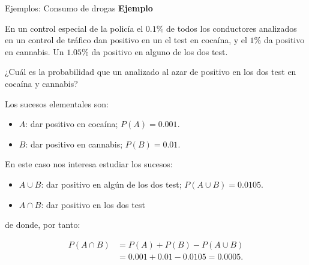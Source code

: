 \documentclass[
  ignorenonframetext,
]{beamer}
\providecommand{\tightlist}{%
  \setlength{\itemsep}{0pt}\setlength{\parskip}{0pt}}
\begin{document}
\begin{frame}{Ejemplos: Consumo de drogas}
\protect\hypertarget{ejemplos-consumo-de-drogas}{}
\textbf{Ejemplo}

En un control especial de la policía el \(0.1\%\) de todos los
conductores analizados en un control de tráfico dan positivo en un el
test en cocaína, y el \(1\%\) da positivo en cannabis. Un \(1.05\%\) da
positivo en alguno de los dos test.

¿Cuál es la probabilidad que un analizado al azar de positivo en los dos
test en cocaína y cannabis?

Los sucesos elementales son:

\begin{itemize}
\tightlist
\item
  \(A\): dar positivo en cocaína; \(P(A)=0.001.\)
\item
  \(B\): dar positivo en cannabis; \(P(B)=0.01.\)
\end{itemize}

En este caso nos interesa estudiar los sucesos:

\begin{itemize}
\tightlist
\item
  \(A\cup B\): dar positivo en algún de los dos test;
  \(P(A\cup B)=0.0105.\)
\item
  \(A\cap B\): dar positivo en los dos test
\end{itemize}

de donde, por tanto:

\[\begin{array}{rl}
{P(A\cap B)} &{=P(A)+P(B)-P(A\cup B)}\\ &{=0.001+0.01-0.0105=0.0005}.
\end{array}\]
\end{frame}
\end{document}
